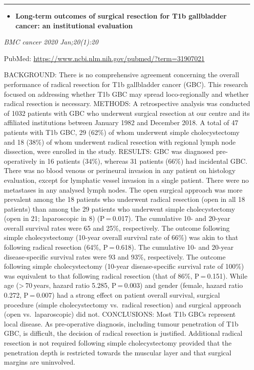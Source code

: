 \documentclass[
]{article}
\providecommand{\tightlist}{%
  \setlength{\itemsep}{0pt}\setlength{\parskip}{0pt}}
\begin{document}
\begin{center}\rule{0.5\linewidth}{0.5pt}\end{center}

\begin{itemize}
\tightlist
\item
  \textbf{Long-term outcomes of surgical resection for T1b gallbladder
  cancer: an institutional evaluation}
\end{itemize}

\emph{BMC cancer 2020 Jan;20(1):20}

PubMed: \url{https://www.ncbi.nlm.nih.gov/pubmed/?term=31907021}

BACKGROUND: There is no comprehensive agreement concerning the overall
performance of radical resection for T1b gallbladder cancer (GBC). This
research focused on addressing whether T1b GBC may spread
loco-regionally and whether radical resection is necessary. METHODS: A
retrospective analysis was conducted of 1032 patients with GBC who
underwent surgical resection at our centre and its affiliated
institutions between January 1982 and December 2018. A total of 47
patients with T1b GBC, 29 (62\%) of whom underwent simple
cholecystectomy and 18 (38\%) of whom underwent radical resection with
regional lymph node dissection, were enrolled in the study. RESULTS: GBC
was diagnosed pre-operatively in 16 patients (34\%), whereas 31 patients
(66\%) had incidental GBC. There was no blood venous or perineural
invasion in any patient on histology evaluation, except for lymphatic
vessel invasion in a single patient. There were no metastases in any
analysed lymph nodes. The open surgical approach was more prevalent
among the 18 patients who underwent radical resection (open in all 18
patients) than among the 29 patients who underwent simple
cholecystectomy (open in 21; laparoscopic in 8) (P = 0.017). The
cumulative 10- and 20-year overall survival rates were 65 and 25\%,
respectively. The outcome following simple cholecystectomy (10-year
overall survival rate of 66\%) was akin to that following radical
resection (64\%, P = 0.618). The cumulative 10- and 20-year
disease-specific survival rates were 93 and 93\%, respectively. The
outcome following simple cholecystectomy (10-year disease-specific
survival rate of 100\%) was equivalent to that following radical
resection (that of 86\%, P = 0.151). While age (\textgreater{} 70 years,
hazard ratio 5.285, P = 0.003) and gender (female, hazard ratio 0.272,
P = 0.007) had a strong effect on patient overall survival, surgical
procedure (simple cholecystectomy vs.~radical resection) and surgical
approach (open vs.~laparoscopic) did not. CONCLUSIONS: Most T1b GBCs
represent local disease. As pre-operative diagnosis, including tumour
penetration of T1b GBC, is difficult, the decision of radical resection
is justified. Additional radical resection is not required following
simple cholecystectomy provided that the penetration depth is restricted
towards the muscular layer and that surgical margins are uninvolved.
\end{document}
